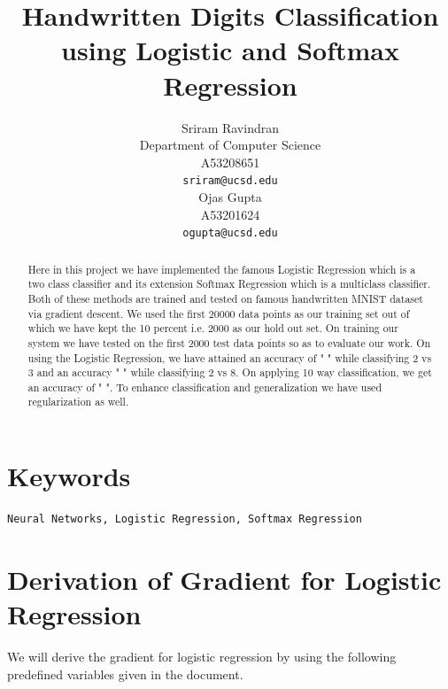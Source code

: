 \documentclass{article} %
\title{Handwritten Digits Classification using Logistic and Softmax Regression}
\author{
Sriram Ravindran\\
Department of Computer Science\\
A53208651 \\
\texttt{sriram@ucsd.edu} \\
\And
Ojas Gupta \\
A53201624 \\
\texttt{ogupta@ucsd.edu} \\
}
\begin{document}
\maketitle
\begin{abstract}
Here in this project we have implemented the famous Logistic Regression which is a two class classifier and its extension Softmax Regression which is a multiclass classifier. Both of these methods are trained and tested on famous handwritten MNIST dataset via gradient descent. We used the first 20000 data points as our training set out of which we have kept the 10 percent i.e. 2000 as our hold out set. On training our system we have tested on the first 2000 test data points so as to evaluate our work. On using the Logistic Regression, we have attained an accuracy of " " while classifying 2 vs 3 and an accuracy " " while classifying 2 vs 8. On applying 10 way classification, we get an accuracy of " ". To enhance classification and generalization we have used regularization as well. 
\end{abstract}

\section{Keywords}

\begin{verbatim}
Neural Networks, Logistic Regression, Softmax Regression
\end{verbatim}
\section{Derivation of Gradient for Logistic Regression}
We will derive the gradient for logistic regression by using the following predefined variables given in the document.
\end{document}
